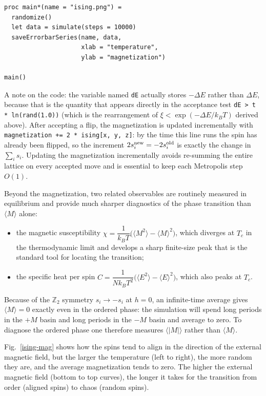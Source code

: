 \documentclass[justified, sixbynine]{tufte-book}
\def\ft{\small\tt}
\theoremstyle{plain}%
\newtheorem * {corollary}{Corollary}
\theoremstyle{definition}
\theoremstyle{remark}
\newtheorem * {remark}{Remark}
\newtheorem * {note}{Note}
\begin{document}
\begin{fullwidth}
\begin{lstlisting}[caption={in file: {\ft ising.nim}}]
proc main*(name = "ising.png") =
  randomize()
  let data = simulate(steps = 10000)
  saveErrorbarSeries(name, data,
                     xlab = "temperature",
                     ylab = "magnetization")

main()
\end{lstlisting}

A note on the code: the variable named {\ft dE} actually stores $-\Delta E$ rather than $\Delta E$, because that is the quantity that appears directly in the acceptance test {\ft dE > t * ln(rand(1.0))} (which is the rearrangement of $\xi < \exp(-\Delta E / k_B T)$ derived above). After accepting a flip, the magnetization is updated incrementally with {\ft magnetization += 2 * ising[x, y, z]}: by the time this line runs the spin has already been flipped, so the increment $2 s_i^{\rm new} = -2 s_i^{\rm old}$ is exactly the change in $\sum_i s_i$. Updating the magnetization incrementally avoids re-summing the entire lattice on every accepted move and is essential to keep each Metropolis step $O(1)$.

Beyond the magnetization, two related observables are routinely measured in equilibrium and provide much sharper diagnostics of the phase transition than $\langle M \rangle$ alone:
\begin{itemize}
\item the magnetic susceptibility $\chi = \dfrac{1}{k_B T}\big(\langle M^2 \rangle - \langle M \rangle^2\big)$, which diverges at $T_c$ in the thermodynamic limit and develops a sharp finite-size peak that is the standard tool for locating the transition;
\item the specific heat per spin $C = \dfrac{1}{N k_B T^2}\big(\langle E^2 \rangle - \langle E \rangle^2\big)$, which also peaks at $T_c$.
\end{itemize}
Because of the $\mathbb{Z}_2$ symmetry $s_i \to -s_i$ at $h = 0$, an infinite-time average gives $\langle M \rangle = 0$ exactly even in the ordered phase: the simulation will spend long periods in the $+M$ basin and long periods in the $-M$ basin and average to zero. To diagnose the ordered phase one therefore measures $\langle |M| \rangle$ rather than $\langle M \rangle$.

Fig.~\ref{ising-mag} shows how the spins tend to align in the direction of the external magnetic field, but the larger the temperature (left to right), the more random they are, and the average magnetization tends to zero. The higher the external magnetic field (bottom to top curves), the longer it takes for the transition from order (aligned spins) to chaos (random spins).


\end{fullwidth}
\end{document}

